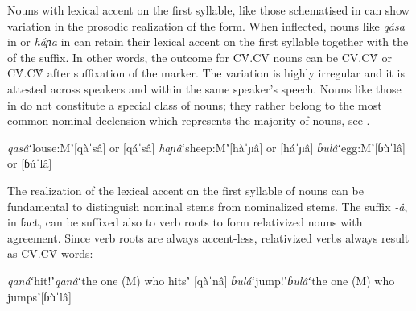 \documentclass[output=paper,modfonts,nonflat,hidelinks]{langsci/langscibook}
\begin{document}
Nouns with lexical accent on the first syllable, like those schematised in  can show variation in the prosodic realization of the  form. When inflected, nouns like \textit{qása} in  or \textit{háɲa} in  can retain their lexical accent on the first syllable together with the  of the  suffix. In other words, the outcome for CV́.CV nouns can be CV.CV̂ or CV́.CV̂ after suffixation of the   marker. The variation is highly irregular and it is attested across speakers and within the same speaker's speech. Nouns like those in  do not constitute a special class of nouns; they rather belong to the most common nominal declension which represents the majority of  nouns, see \citet[74]{Petrollino2016}. 
\begin{exe}
\ex \label{ex:Petrollino:irregular}\begin{xlist}
\ex \textit{qasâ}\hspace{16mm}ʻlouse:Mʼ\hspace{10mm}[qàˈsâ] or [qáˈsâ]
\ex \textit{haɲâ}\hspace{16mm}ʻsheep:Mʼ\hspace{9mm}[hàˈɲâ] or [háˈɲâ]
\ex \textit{ɓulâ}\hspace{17mm}ʻegg:Mʼ\hspace{13mm}[ɓùˈlâ] or [ɓúˈlâ]
\end{xlist}
\end{exe}

The realization of the lexical accent on the first syllable of  nouns can be fundamental to distinguish nominal stems from nominalized stems. The  suffix \textit{-â}, in fact, can be suffixed also to verb roots to form relativized nouns with  agreement. Since verb roots are always accent-less,  relativized verbs always result as CV.CV̂ words:
\begin{exe}
\ex \label{ex:Petrollino:relativized verbs} \begin{xlist}
\ex \textit{qaná}\hspace{15mm}ʻhit!ʼ\hspace{8mm}\textit{qanâ}\hspace{8mm}ʻthe one (M) who hitsʼ\hspace{5mm} [qàˈnâ]
\ex \textit{ɓulá}\hspace{16mm}ʻjump!ʼ\hspace{4mm}\textit{ɓulâ}\hspace{9mm}ʻthe one (M) who jumpsʼ\hspace{2mm}[ɓùˈlâ]
\end{xlist}
\end{exe}
\end{document}
